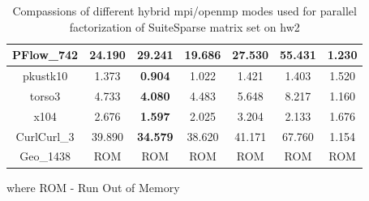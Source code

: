 \begin{table}[h!]
\begin{tabular}{|c|c|c|c|c|c|c|}
\\ \hline
PFlow\_742                                            & 24.190                                                    & 29.241                                                     & \textbf{19.686}                                           & 27.530                                                     & 55.431                                                     & 1.230                                                           \\ \hline
pkustk10                                              & 1.373                                                     & \textbf{0.904}                                             & 1.022                                                     & 1.421                                                      & 1.403                                                      & 1.520                                                           \\ \hline
torso3                                                & 4.733                                                     & \textbf{4.080}                                             & 4.483                                                     & 5.648                                                      & 8.217                                                      & 1.160                                                           \\ \hline
x104                                                  & 2.676                                                     & \textbf{1.597}                                             & 2.025                                                     & 3.204                                                      & 2.133                                                      & 1.676                                                           \\ \hline
CurlCurl\_3                                           & 39.890                                                    & \textbf{34.579}                                            & 38.620                                                    & 41.171                                                     & 67.760                                                     & 1.154                                                           \\ \hline
Geo\_1438                                             & ROM                                                       & ROM                                                        & ROM                                                       & ROM                                                        & ROM                                                        & ROM                                                             \\ \hline
\end{tabular}
\caption{Compassions of different hybrid \acrshort{mpi}/\acrshort{openmp} modes used for parallel factorization of SuiteSparse matrix set on \gls{hw2}\\}
where ROM - Run Out of Memory
\label{fig:mpi-omp-suitesparse-hw2}
\end{table}


